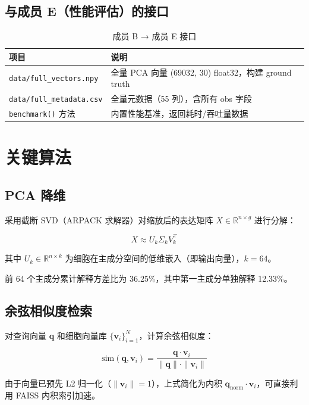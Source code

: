 \documentclass[12pt,a4paper]{ctexart}
\begin{document}
\subsection{与成员 E（性能评估）的接口}

\begin{table}[H]
\centering
\caption{成员 B → 成员 E 接口}
\begin{tabular}{l|p{8cm}}
\toprule
\textbf{项目} & \textbf{说明} \\
\midrule
\texttt{data/full\_vectors.npy}  & 全量 PCA 向量 (69032, 30) float32，构建 ground truth \\
\texttt{data/full\_metadata.csv} & 全量元数据（55 列），含所有 obs 字段 \\
\texttt{benchmark()} 方法        & 内置性能基准，返回耗时/吞吐量数据 \\
\bottomrule
\end{tabular}
\end{table}

\section{关键算法}

\subsection{PCA 降维}

采用截断 SVD（ARPACK 求解器）对缩放后的表达矩阵 $X \in \mathbb{R}^{n \times g}$ 进行分解：

$$X \approx U_k \Sigma_k V_k^\top$$

其中 $U_k \in \mathbb{R}^{n \times k}$ 为细胞在主成分空间的低维嵌入（即输出向量），$k=64$。

前 64 个主成分累计解释方差比为 36.25\%，其中第一主成分单独解释 12.33\%。

\subsection{余弦相似度检索}

对查询向量 $\mathbf{q}$ 和细胞向量库 $\{\mathbf{v}_i\}_{i=1}^N$，计算余弦相似度：

$$\text{sim}(\mathbf{q}, \mathbf{v}_i) = \frac{\mathbf{q} \cdot \mathbf{v}_i}{\|\mathbf{q}\| \cdot \|\mathbf{v}_i\|}$$

由于向量已预先 L2 归一化（$\|\mathbf{v}_i\| = 1$），上式简化为内积 $\mathbf{q}_{\text{norm}} \cdot \mathbf{v}_i$，可直接利用 FAISS 内积索引加速。
\end{document}
